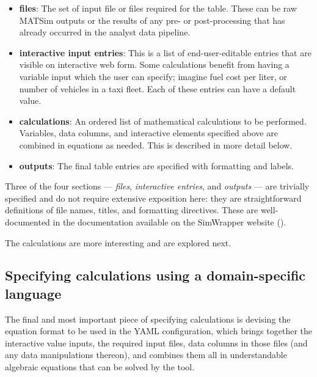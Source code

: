 \begin{itemize}

  \item \textbf{files}: The set of input file or files required for the table. These can be raw MATSim outputs or the results of any pre- or post-processing that has already occurred in the analyst data pipeline.

  \item \textbf{interactive input entries}: This is a list of end-user-editable entries that are visible on interactive web form. Some calculations benefit from having a variable input which the user can specify; imagine fuel cost per liter, or number of vehicles in a taxi fleet. Each of these entries can have a default value.

  \item \textbf{calculations}: An ordered list of mathematical calculations to be performed. Variables, data columns, and interactive elements specified above are combined in equations as needed. This is described in more detail below.

  \item \textbf{outputs}: The final table entries are specified with formatting and labels.

\end{itemize}

Three of the four sections --- \emph{files}, \emph{interactive entries}, and \emph{outputs} --- are trivially specified and do not require extensive exposition here: they are straightforward definitions of file names, titles, and formatting directives. These are well-documented in the documentation available on the SimWrapper website (\cite{SimWrapperWebsite}).

The calculations are more interesting and are explored next.

\hypertarget{calculation-tables-dsl}{%
\subsection{Specifying calculations using a domain-specific language}\label{calculation-tables-dsl}}

The final and most important piece of specifying calculations is devising the equation format to be used in the YAML configuration, which brings together the interactive value inputs, the required input files, data columns in those files (and any data manipulations thereon), and combines them all in understandable algebraic equations that can be solved by the tool.

